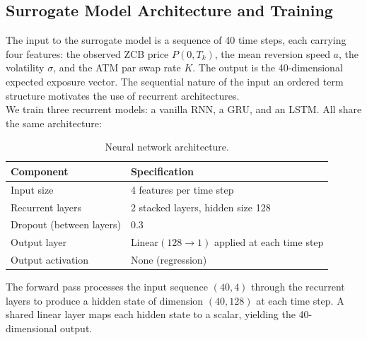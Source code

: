   \subsection{Surrogate Model Architecture and Training}

  The input to the surrogate model is a sequence of 40 time steps, each carrying four features: the observed ZCB price $P(0, T_k)$, the mean reversion speed $a$, the volatility $\sigma$, and
   the ATM par swap rate $K$. The output is the 40-dimensional expected exposure vector. The sequential nature of the input an ordered term structure motivates the use of recurrent
  architectures.\\
  \noindent
  We train three recurrent models: a vanilla RNN, a GRU, and an LSTM. All share the same architecture:

  \begin{table}[htbp]
  \centering
  \caption{Neural network architecture.}\label{tab:architecture}
  \begin{tabular}{ll}
  \toprule
  \textbf{Component} & \textbf{Specification} \\
  \midrule
  Input size & 4 features per time step \\
  Recurrent layers & 2 stacked layers, hidden size 128 \\
  Dropout (between layers) & 0.3 \\
  Output layer & Linear$(128 \rightarrow 1)$ applied at each time step \\
  Output activation & None (regression) \\
  \bottomrule
  \end{tabular}
  \end{table}

  \noindent
  The forward pass processes the input sequence $(40, 4)$ through the recurrent layers to produce a hidden state of dimension $(40, 128)$ at each time step. A shared linear layer maps each
  hidden state to a scalar, yielding the 40-dimensional output.

